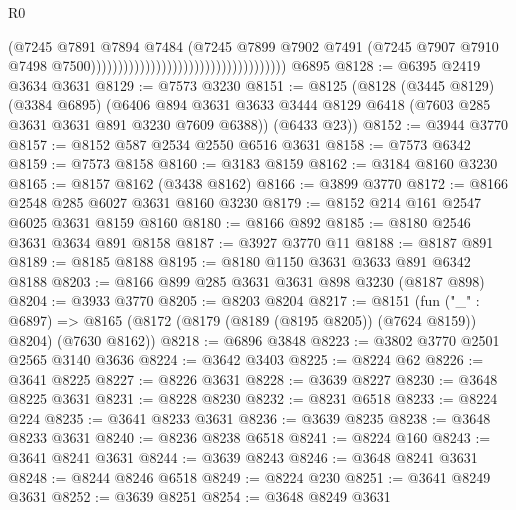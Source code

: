 \begin{lexlean}{R0}
\begin{coremodule}
                                                                      (@7245
                                                                        @7891
                                                                        @7894
                                                                        @7484
                                                                        (@7245
                                                                          @7899
                                                                          @7902
                                                                          @7491
                                                                          (@7245
                                                                            @7907
                                                                            @7910
                                                                            @7498
                                                                            @7500))))))))))))))))))))))))))))))))))))
    @6895
@8128 := @6395 @2419 @3634 @3631
@8129 := @7573 @3230
@8151 := @8125
    (@8128
      (@3445 @8129)
      (@3384 @6895)
      (@6406 @894 @3631 @3633 @3444 @8129 @6418 (@7603 @285 @3631 @3631 @891 @3230 @7609 @6388))
      (@6433 @23))
@8152 := @3944 @3770
@8157 := @8152 @587 @2534 @2550 @6516 @3631
@8158 := @7573 @6342
@8159 := @7573 @8158
@8160 := @3183 @8159
@8162 := @3184 @8160 @3230
@8165 := @8157 @8162 (@3438 @8162)
@8166 := @3899 @3770
@8172 := @8166 @2548 @285 @6027 @3631 @8160 @3230
@8179 := @8152 @214 @161 @2547 @6025 @3631 @8159 @8160
@8180 := @8166 @892
@8185 := @8180 @2546 @3631 @3634 @891 @8158
@8187 := @3927 @3770 @11
@8188 := @8187 @891
@8189 := @8185 @8188
@8195 := @8180 @1150 @3631 @3633 @891 @6342 @8188
@8203 := @8166 @899 @285 @3631 @3631 @898 @3230 (@8187 @898)
@8204 := @3933 @3770
@8205 := @8203 @8204
@8217 := @8151
    (fun ("_" : @6897) =>
    @8165 (@8172 (@8179 (@8189 (@8195 @8205)) (@7624 @8159)) @8204) (@7630 @8162))
@8218 := @6896 @3848
@8223 := @3802 @3770 @2501 @2565 @3140 @3636
@8224 := @3642 @3403
@8225 := @8224 @62
@8226 := @3641 @8225
@8227 := @8226 @3631
@8228 := @3639 @8227
@8230 := @3648 @8225 @3631
@8231 := @8228 @8230
@8232 := @8231 @6518
@8233 := @8224 @224
@8235 := @3641 @8233 @3631
@8236 := @3639 @8235
@8238 := @3648 @8233 @3631
@8240 := @8236 @8238 @6518
@8241 := @8224 @160
@8243 := @3641 @8241 @3631
@8244 := @3639 @8243
@8246 := @3648 @8241 @3631
@8248 := @8244 @8246 @6518
@8249 := @8224 @230
@8251 := @3641 @8249 @3631
@8252 := @3639 @8251
@8254 := @3648 @8249 @3631

\end{coremodule}
\end{lexlean}
